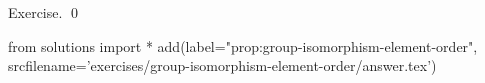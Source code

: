 
\begin{prop}
  \label{prop:group-isomorphism-element-order}
  
\end{prop}
\proof
Exercise.
\qed
\begin{python0}
from solutions import *
add(label="prop:group-isomorphism-element-order",
    srcfilename='exercises/group-isomorphism-element-order/answer.tex') 
\end{python0}
